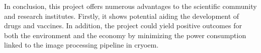 \documentclass[../main.tex]{subfiles}
\begin{document}
In conclusion, this project offers numerous advantages to the scientific community and research institutes. Firstly, it shows potential aiding the development of drugs and vaccines. In addition, the project could yield positive outcomes for both the environment and the economy by minimizing the power consumption linked to the image processing pipeline in \gls{cryoem}.
\end{document}
